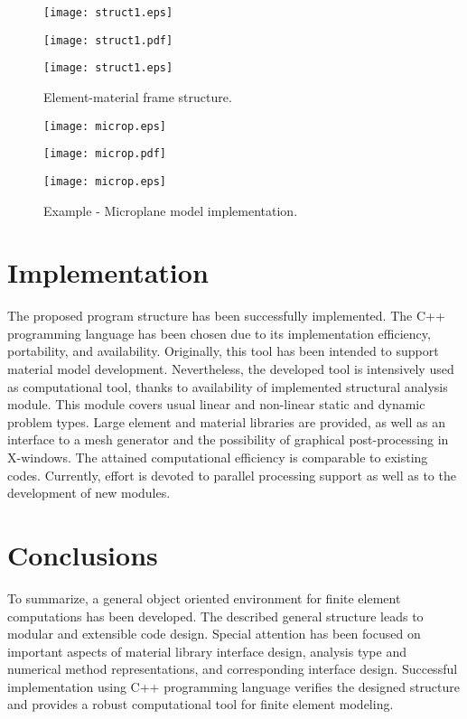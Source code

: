 \documentclass[a4paper]{article}
\begin{document}
\begin{figure}[tb]
\begin{htmlonly}
  \centerline{\texttt{[image: struct1.eps]}}
\end{htmlonly}
\ifpdf
\centerline{\texttt{[image: struct1.pdf]}}
\else
\centerline{\texttt{[image: struct1.eps]}}
\fi
\caption{Element-material frame  structure.}
\label{materelementFrame1}
\end{figure}

\begin{figure}[tb]
\begin{htmlonly}
  \centerline{\texttt{[image: microp.eps]}}
\end{htmlonly}
\ifpdf
\centerline{\texttt{[image: microp.pdf]}}
\else
\centerline{\texttt{[image: microp.eps]}}
\fi
\caption{Example - Microplane model implementation.}
\label{microplaneFig}
\end{figure}



\clearpage


\section{Implementation}
The proposed program structure has been successfully implemented. The C++
programming language has been chosen due to its implementation
efficiency, portability, and availability. Originally, this tool has
been intended  to support material model development. Nevertheless, the
developed tool is intensively used as computational tool, thanks to
availability of implemented structural analysis module. This module
covers usual linear and non-linear static and dynamic problem
types. Large element and material libraries are provided, as well as
an interface to a mesh generator and the possibility of graphical
post-processing in X-windows. The attained computational efficiency is
comparable to existing codes. Currently, effort is devoted to parallel
processing support as well as to the development of new modules. 



\section{Conclusions}
To summarize, a general object oriented environment for finite element computations has been developed.
The described general structure leads to modular and extensible code design.
Special attention has been focused on important aspects of material library interface design, analysis type and 
numerical method representations, and corresponding interface design.
Successful implementation using C++ programming language verifies
the designed structure and provides a robust computational tool for finite
element modeling.
\end{document}
